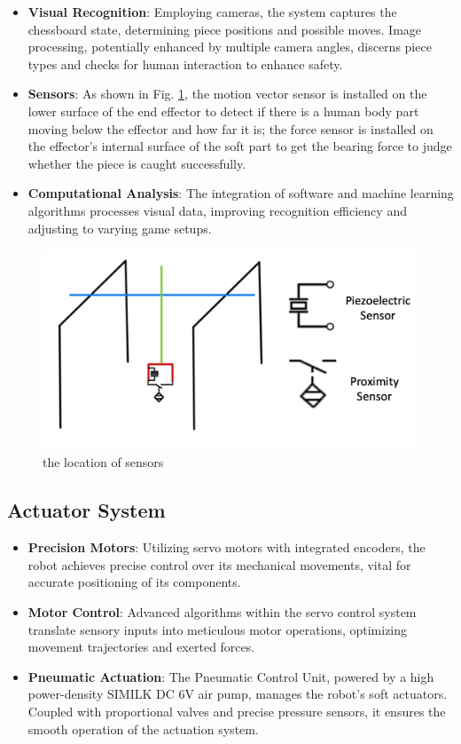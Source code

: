 \documentclass[10pt, a4paper, twocolumn]{article}
\begin{document}
\begin{itemize}
    \item \textbf{Visual Recognition}: Employing cameras, the system captures the chessboard state, determining piece positions and possible moves. Image processing, potentially enhanced by multiple camera angles, discerns piece types and checks for human interaction to enhance safety.
    \item \textbf{Sensors}: As shown in Fig. \ref{fig:sensor position}, the motion vector sensor is installed on the lower surface of the end effector to detect if there is a human body part moving below the effector and how far it is; the force sensor is installed on the effector’s internal surface of the soft part to get the bearing force to judge whether the piece is caught successfully.
    \item \textbf{Computational Analysis}: The integration of software and machine learning algorithms processes visual data, improving recognition efficiency and adjusting to varying game setups.
\end{itemize}

\begin{figure}
    \centering
    \includegraphics[width=0.8\linewidth]{sensor position.png}
    \caption{the location of sensors}
    \label{fig:sensor position}
\end{figure}

\subsection{Actuator System}

\begin{itemize}
    \item \textbf{Precision Motors}: Utilizing servo motors with integrated encoders, the robot achieves precise control over its mechanical movements, vital for accurate positioning of its components.
    \item \textbf{Motor Control}: Advanced algorithms within the servo control system translate sensory inputs into meticulous motor operations, optimizing movement trajectories and exerted forces.
    \item \textbf{Pneumatic Actuation}: The Pneumatic Control Unit, powered by a high power-density SIMILK DC 6V air pump, manages the robot's soft actuators. Coupled with proportional valves and precise pressure sensors, it ensures the smooth operation of the actuation system.
\end{itemize}
\end{document}
